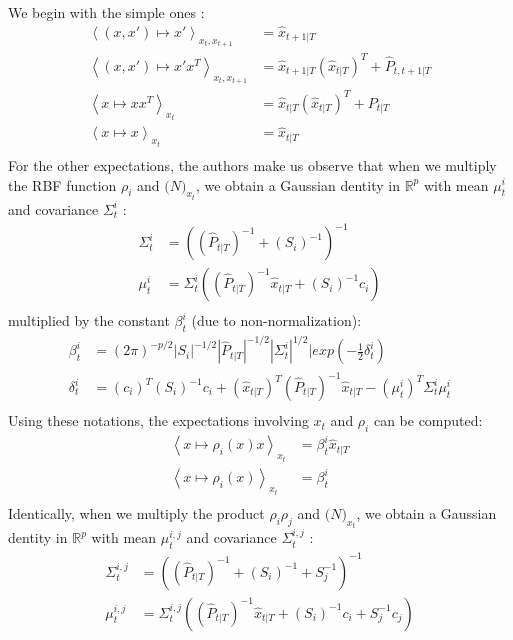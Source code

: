 We begin with the simple ones :
\begin{align*}
  \left< (x,x') \mapsto x'\right>_{x_t,x_{t+1}} &= \hat{x}_{t+1|T}\\
  \left< (x,x') \mapsto x'x^T\right>_{x_t,x_{t+1}} &= \hat{x}_{t+1|T} (\hat{x}_{t|T})^T + \hat{P}_{t,t+1|T}\\
  \left< x \mapsto xx^T\right>_{x_t} &= \hat{x}_{t|T} (\hat{x}_{t|T})^T + P_{t|T}\\
  \left< x \mapsto x\right>_{x_t} &= \hat{x}_{t|T}\\
\end{align*}
For the other expectations, the authors make us observe that when we multiply the RBF function $\rho_i$ and $\mathcal(N)_{x_t}$, we obtain a Gaussian dentity in $\mathbb{R}^p$ with mean $\mu^i_t$ and covariance $\Sigma^i_t$ :
\begin{align*}
  \Sigma^i_t &= \left( (\hat{P}_{t|T})^{-1} + (S_i)^{-1} \right)^{-1}\\
  \mu^i_t &= \Sigma^i_t \left( (\hat{P}_{t|T})^{-1} \hat{x}_{t|T} + (S_i)^{-1}c_i \right)\\
\end{align*}
multiplied by the constant $\beta^i_t$ (due to non-normalization):
\begin{align*}
  \beta^i_t &= (2\pi)^{-p/2} |S_i|^{-1/2} |\hat{P}_{t|T}|^{-1/2} |\Sigma^i_t|^{1/2}| exp(-\frac{1}{2} \delta^i_t)\\
  \delta^i_t &= (c_i)^T (S_i)^{-1} c_i + (\hat{x}_{t|T})^T (\hat{P}_{t|T})^{-1} \hat{x}_{t|T} - (\mu^i_t)^T \Sigma^i_t \mu^i_t\\
\end{align*}
Using these notations, the expectations involving $x_t$ and $\rho_i$ can be computed:
\begin{align*}
  \left< x \mapsto \rho_i(x) x \right>_{x_t} &= \beta^i_t \hat{x}_{t|T}\\
  \left< x \mapsto \rho_i(x) \right>_{x_t} &= \beta^i_t\\
\end{align*}
Identically, when we multiply the product $\rho_i \rho_j$ and $\mathcal(N)_{x_t}$, we obtain a Gaussian dentity in $\mathbb{R}^p$ with mean $\mu^{i,j}_t$ and covariance $\Sigma^{i,j}_t$ :
\begin{align*}
  \Sigma^{i,j}_t &= \left( (\hat{P}_{t|T})^{-1} + (S_i)^{-1} + S_j^{-1} \right)^{-1}\\
  \mu^{i,j}_t &= \Sigma^{i,j}_t \left( (\hat{P}_{t|T})^{-1} \hat{x}_{t|T} + (S_i)^{-1}c_i + S_j^{-1}c_j \right)\\
\end{align*}
